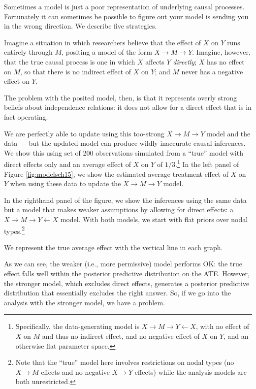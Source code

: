 \documentclass[
  12pt,
]{book}
\begin{document}
Sometimes a model is just a poor representation of underlying causal processes. Fortunately it can sometimes be possible to figure out your model is sending you in the wrong direction. We describe five strategies.

Imagine a situation in which researchers believe that the effect of \(X\) on \(Y\) runs entirely through \(M\), positing a model of the form \(X \rightarrow M \rightarrow Y\). Imagine, however, that the true causal process is one in which \(X\) affects \(Y\) \emph{directly}; \(X\) has no effect on \(M\), so that there is no indirect effect of \(X\) on \(Y\); and \(M\) never has a negative effect on \(Y\).

The problem with the posited model, then, is that it represents overly strong beliefs about independence relations: it does not allow for a direct effect that is in fact operating.

We are perfectly able to update using this too-strong \(X \rightarrow M \rightarrow Y\) model and the data --- but the updated model can produce wildly inaccurate causal inferences. We show this using set of 200 observations simulated from a ``true'' model with direct effects only and an average effect of \(X\) on \(Y\) of \(1/3\).\footnote{Specifically, the data-generating model is \(X \rightarrow M \rightarrow Y \leftarrow X\), with no effect of \(X\) on \(M\) and thus no indirect effect, and no negative effect of \(X\) on \(Y\), and an otherwise flat parameter space.} In the left panel of Figure \ref{fig:modelsch15}, we show the estimated average treatment effect of \(X\) on \(Y\) when using these data to update the \(X \rightarrow M \rightarrow Y\) model.

In the righthand panel of the figure, we show the inferences using the same data but a model that makes weaker assumptions by allowing for direct effects: a \(X \rightarrow M \rightarrow Y \leftarrow X\) model. With both models, we start with flat priors over nodal types.\footnote{Note that the ``true'' model here involves restrictions on nodal types (no \(X \rightarrow M\) effects and no negative \(X \rightarrow Y\) effects) while the analysis models are both unrestricted.}

We represent the true average effect with the vertical line in each graph.

As we can see, the weaker (i.e., more permissive) model performs OK: the true effect falls well within the posterior predictive distribution on the ATE. However, the stronger model, which excludes direct effects, generates a posterior predictive distribution that essentially excludes the right answer. So, if we go into the analysis with the stronger model, we have a problem.
\end{document}
